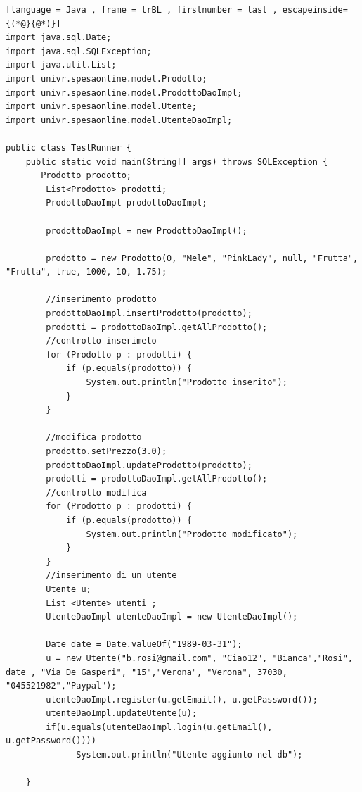 \documentclass{article}
\begin{document}
\begin{lstlisting}[language = Java , frame = trBL , firstnumber = last , escapeinside={(*@}{@*)}]
import java.sql.Date;
import java.sql.SQLException;
import java.util.List;
import univr.spesaonline.model.Prodotto;
import univr.spesaonline.model.ProdottoDaoImpl;
import univr.spesaonline.model.Utente;
import univr.spesaonline.model.UtenteDaoImpl;

public class TestRunner {
    public static void main(String[] args) throws SQLException {
       Prodotto prodotto;
        List<Prodotto> prodotti;
        ProdottoDaoImpl prodottoDaoImpl;

        prodottoDaoImpl = new ProdottoDaoImpl();

        prodotto = new Prodotto(0, "Mele", "PinkLady", null, "Frutta", "Frutta", true, 1000, 10, 1.75);

        //inserimento prodotto 
        prodottoDaoImpl.insertProdotto(prodotto);
        prodotti = prodottoDaoImpl.getAllProdotto();
        //controllo inserimeto
        for (Prodotto p : prodotti) {
            if (p.equals(prodotto)) {
                System.out.println("Prodotto inserito");
            }
        }

        //modifica prodotto
        prodotto.setPrezzo(3.0);
        prodottoDaoImpl.updateProdotto(prodotto);
        prodotti = prodottoDaoImpl.getAllProdotto();
        //controllo modifica
        for (Prodotto p : prodotti) {
            if (p.equals(prodotto)) {
                System.out.println("Prodotto modificato");
            }
        }
        //inserimento di un utente
        Utente u;
        List <Utente> utenti ;
        UtenteDaoImpl utenteDaoImpl = new UtenteDaoImpl();
       
        Date date = Date.valueOf("1989-03-31");
        u = new Utente("b.rosi@gmail.com", "Ciao12", "Bianca","Rosi", date , "Via De Gasperi", "15","Verona", "Verona", 37030, "045521982","Paypal");
        utenteDaoImpl.register(u.getEmail(), u.getPassword());
        utenteDaoImpl.updateUtente(u);
        if(u.equals(utenteDaoImpl.login(u.getEmail(), u.getPassword())))
              System.out.println("Utente aggiunto nel db");
        
    }
    \end{lstlisting}
\end{document}
